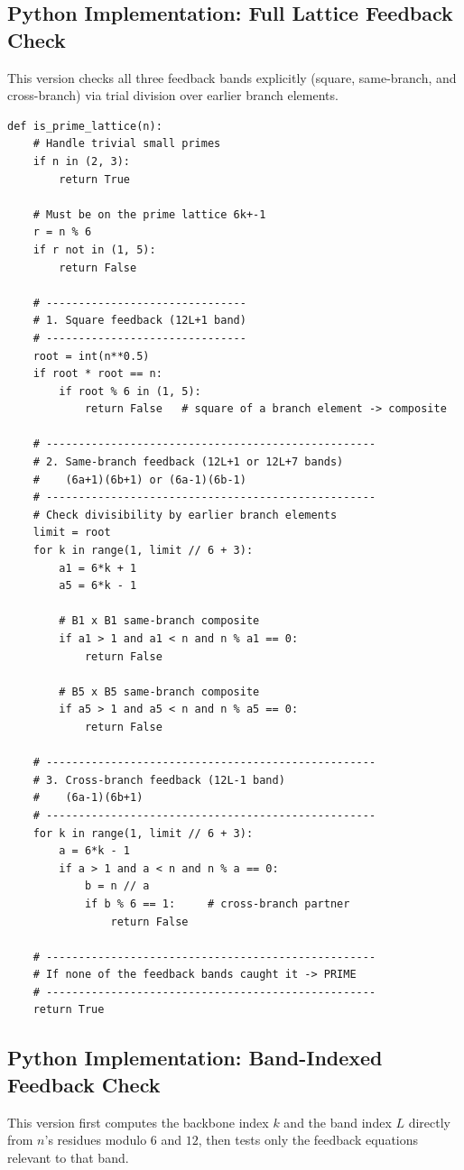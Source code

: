 \documentclass[12pt]{article}
\begin{document}
\subsection*{Python Implementation: Full Lattice Feedback Check}
This version checks all three feedback bands explicitly (square, same-branch,
and cross-branch) via trial division over earlier branch elements.

\begin{lstlisting}
def is_prime_lattice(n):
    # Handle trivial small primes
    if n in (2, 3):
        return True

    # Must be on the prime lattice 6k+-1
    r = n % 6
    if r not in (1, 5):
        return False

    # -------------------------------
    # 1. Square feedback (12L+1 band)
    # -------------------------------
    root = int(n**0.5)
    if root * root == n:
        if root % 6 in (1, 5):
            return False   # square of a branch element -> composite

    # ---------------------------------------------------
    # 2. Same-branch feedback (12L+1 or 12L+7 bands)
    #    (6a+1)(6b+1) or (6a-1)(6b-1)
    # ---------------------------------------------------
    # Check divisibility by earlier branch elements
    limit = root
    for k in range(1, limit // 6 + 3):
        a1 = 6*k + 1
        a5 = 6*k - 1

        # B1 x B1 same-branch composite
        if a1 > 1 and a1 < n and n % a1 == 0:
            return False

        # B5 x B5 same-branch composite
        if a5 > 1 and a5 < n and n % a5 == 0:
            return False

    # ---------------------------------------------------
    # 3. Cross-branch feedback (12L-1 band)
    #    (6a-1)(6b+1)
    # ---------------------------------------------------
    for k in range(1, limit // 6 + 3):
        a = 6*k - 1
        if a > 1 and a < n and n % a == 0:
            b = n // a
            if b % 6 == 1:     # cross-branch partner
                return False

    # ---------------------------------------------------
    # If none of the feedback bands caught it -> PRIME
    # ---------------------------------------------------
    return True
\end{lstlisting}

\subsection*{Python Implementation: Band-Indexed Feedback Check}
This version first computes the backbone index $k$ and the band index $L$
directly from $n$'s residues modulo $6$ and $12$, then tests only the
feedback equations relevant to that band.
\end{document}
